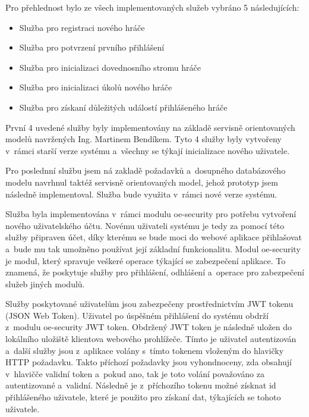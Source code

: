 \documentclass[12pt]{article}
\begin{document}
{\cite{springbootDocs}



Pro přehlednost bylo ze všech implementovaných služeb vybráno 5 následujících:

\begin{itemize}
\item Služba pro registraci nového hráče
\item Služba pro potvrzení prvního přihlášení
\item Služba pro inicializaci dovednosního stromu hráče
\item Služba pro inicializaci úkolů nového hráče
\item Služba pro získaní důležitých událostí přihlášeného hráče
\end{itemize}

První 4 uvedené služby byly implementovány na základě servisně orientovaných modelů navržených Ing. Martinem Bendíkem.
Tyto 4 služby byly vytvořeny v~rámci starší verze systému a~všechny se týkají inicializace nového uživatele.

Pro poslednní službu jsem ná zakladě požadavků a~dosupného databázového modelu navrhnul taktéž servisně orientovaných model,
jehož prototyp jsem následně implementoval. Služba bude využita v~rámci nové verze systému.

\clearpage


Služba byla implementována v~rámci modulu oe-security pro potřebu vytvoření nového uživatelského účtu.
Novému uživateli systému je tedy za pomocí této služby připraven účet,
díky kterému se bude moci do webové aplikace přihlašovat a~bude mu tak umožněno používat její základní funkcionalitu.
Modul oe-security je modul, který spravuje veškeré operace týkající se zabezpečení aplikace.
To znamená, že poskytuje služby pro přihlášení, odhlášení a~operace pro zabezpečení služeb jiných modulů.

Služby poskytované uživatelům jsou zabezpečeny prostřednictvím JWT tokenu (JSON Web Token).
Uživatel po úspěšném přihlášení do systému obdrží z~modulu oe-security JWT token.
Obdržený JWT token je následně uložen do lokálního uložiště klientova webového prohlížeče. 
Tímto je uživatel autentizován a~další služby jsou z~aplikace volány s~tímto tokenem vloženým do hlavičky HTTP požadavku. 
Takto příchozí požadavky jsou vyhondnoceny, zda obsahují v~hlavičče validní token a~pokud ano, 
tak je toto volání považováno za autentizované a~validní. Následně je z~příchozího tokenu možné získnat id přihlášeného uživatele,
které je použito pro získaní dat, týkajících se tohoto uživatele.

}
\end{document}
